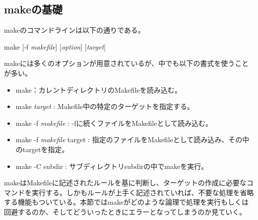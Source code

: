 \documentclass[dvipdfmx, 9pt, a4paper]{jsarticle}
\numberwithin{equation}{section}
\begin{document}
\subsection{makeの基礎}
makeのコマンドラインは以下の通りである。
\begin{center}
make [-f {\it makefile}] [{\it option}] [{\it target}]
\end{center}
makeには多くのオプションが用意されているが、中でも以下の書式を使うことが多い。
\begin{itemize}
\item make：カレントディレクトリのMakefileを読み込む。
\item make {\it target} : Makefile中の特定のターゲットを指定する。
\item make -f  {\it makefile} : -fに続くファイルをMakefileとして読み込む。
\item make -f {\it makefile} target : 指定のファイルをMakefileとして読み込み、その中のtargetを指定。
\item make -C subdir : サブディレクトリsubdirの中でmakeを実行。
\end{itemize}\par
makeはMakefileに記述されたルールを基に判断し、ターゲットの作成に必要なコマンドを実行する。しかもルールが上手く記述されていれば、不要な処理を省略する機能もついている。本節ではmakeがどのような論理で処理を実行もしくは回避するのか、そしてどういったときにエラーとなってしまうのか見ていく。\par
\end{document}
